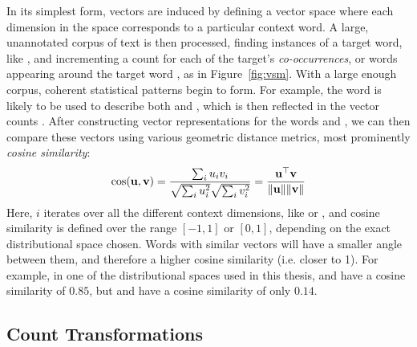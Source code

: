 In its simplest form, vectors are induced by defining a vector space where
each dimension in the space corresponds to a particular context word. A large,
unannotated corpus of text is then processed, finding instances of a target word,
like , and incrementing a count for each of the target's {\em
co-occurrences}, or words appearing around the target word
, as in Figure~\ref{fig:vsm}. With a large enough corpus, coherent
statistical patterns begin to form. For example, the word  is likely
to be used to describe both  and , which is then reflected in
the vector counts \cite{lund:1996:brmic}. After constructing vector
representations for the words  and , we can then compare
these vectors using various geometric distance metrics, most prominently {\em
cosine similarity}:
\begin{equation}
  \text{cos}({\mathbf{u}}, {\mathbf{v}}) = \frac{\sum_i u_iv_i}{\sqrt{\sum_i u_i^2}\sqrt{\sum_i v_i^2}} = \frac{{{\mathbf{u}}}^\top{{\mathbf{v}}}}{\lVert {\mathbf{u}} \rVert \lVert {\mathbf{v}} \rVert}
  \label{eqn:cos}
\end{equation}
Here, $i$ iterates over all the different context dimensions, like 
or , and cosine similarity is defined over the range $[-1, 1]$ or
$[0, 1]$, depending on the exact distributional space chosen.
Words with similar vectors will have a smaller angle between them, and
therefore a higher cosine similarity (i.e. closer to 1). For example, in one of
the distributional spaces used in this thesis,  and 
have a cosine similarity of $0.85$, but  and  have a
cosine similarity of only $0.14$.

\subsection{Count Transformations}

